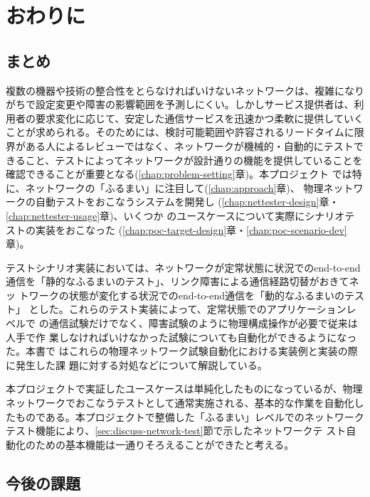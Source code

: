 
\chapter{おわりに}

 \section{まとめ}
 \label{sec:summary}

複数の機器や技術の整合性をとらなければいけないネットワークは、複雑になり
がちで設定変更や障害の影響範囲を予測しにくい。しかしサービス提供者は、利
用者の要求変化に応じて、安定した通信サービスを迅速かつ柔軟に提供していく
ことが求められる。そのためには、検討可能範囲や許容されるリードタイムに限
界がある人によるレビューではなく、ネットワークが機械的・自動的にテストで
きること、テストによってネットワークが設計通りの機能を提供していることを
確認できることが重要となる(\ref{chap:problem-setting}章)。本プロジェクト
では特に、ネットワークの「ふるまい」に注目して(\ref{chap:approach}章)、
物理ネットワークの自動テストをおこなうシステムを開発し
(\ref{chap:nettester-design}章・\ref{chap:nettester-usage}章)、いくつか
のユースケースについて実際にシナリオテストの実装をおこなった
(\ref{chap:poc-target-design}章・\ref{chap:poc-scenario-dev}章)。

テストシナリオ実装においては、ネットワークが定常状態に状況でのend-to-end
通信を「静的なふるまいのテスト」、リンク障害による通信経路切替がおきてネッ
トワークの状態が変化する状況でのend-to-end通信を「動的なふるまいのテスト」
とした。これらのテスト実装によって、定常状態でのアプリケーションレベルで
の通信試験だけでなく、障害試験のように物理構成操作が必要で従来は人手で作
業しなければいけなかった試験についても自動化ができるようになった。本書で
はこれらの物理ネットワーク試験自動化における実装例と実装の際に発生した課
題に対する対処などについて解説している。

本プロジェクトで実証したユースケースは単純化したものになっているが、物理
ネットワークでおこなうテストとして通常実施される、基本的な作業を自動化し
たものである。本プロジェクトで整備した「ふるまい」レベルでのネットワーク
テスト機能により、\ref{sec:discuss-network-test}節で示したネットワークテ
スト自動化のための基本機能は一通りそろえることができたと考える。

 \section{今後の課題}
 \label{sec:future-work}

